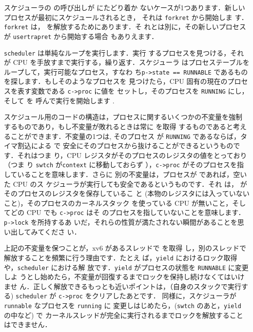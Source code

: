 スケジューラの  の呼び出しが  にたどり着か
ないケースが1つあります．新しいプロセスが最初にスケジュールされるとき，
それは \lstinline{forkret} 
から開始しま
す．\lstinline{forkret} は， を解放するためにあります．そ
れとは別に，その新しいプロセスが \lstinline{usertrapret} から開始する場合
もありえます．

\lstinline{scheduler}
は単純なループを実行します．実行
するプロセスを見つける，それが CPU を手放すまで実行する，繰り返す．スケジューラ
はプロセステーブルをループして，実行可能なプロセス，すなわ
ち\lstinline{p->state == RUNNABLE} であるものを探します．もしそのようなプロセスを
見つけたら，CPU 固有の現在のプロセスを表す変数である \lstinline{c->proc} に値を
セットし，そのプロセスを \lstinline{RUNNING} にし，そして  を
呼んで実行を開始します .

スケジュール用のコードの構造は，プロセスに関するいくつかの不変量を強制
するものであり，もし不変量が敗れるときは常に  を取得
するものであると考えることができます．不変量の1つは, そのプロセス
が \lstinline{RUNNING} であるならば，タイマ割込による で
安全にそのプロセスから抜けることができるというものです．それはつま
り，CPU レジスタがそのプロセスのレジスタの値をとっており（つま
り \lstinline{swtch} が\lstinline{context} に移動しておらず
），\lstinline{c->proc} がそのプロセスを指していることを意味します．さらに
別の不変量は，プロセスが  であれば，空いた CPU のス
ケジューラが実行しても安全であるというものです．それ
は， がそのプロセスのレジスタを保存しているこ
と (本物のレジスタには入っていないこと)，そのプロセスのカーネルスタック
を使っている CPU が無いこと，そしてどの CPU でも \lstinline{c->proc} はそ
のプロセスを指していないことを意味します．\lstinline{p->lock} を所持するあ
いだ，それらの性質が満たされない瞬間があることを思い出してみてくださ
い．

上記の不変量を保つことが，xv6 があるスレッドで  を取得
し，別のスレッドで解放することを頻繁に行う理由です．たとえ
ば，\lstinline{yield} におけるロック取得や，\lstinline{scheduler} における解
放です．\lstinline{yield} がプロセスの状態を \lstinline{RUNNABLE} に変更しよ
うとし始めたら，不変量が回復するまでロックを保持し続けなくてはいけませ
ん．正しく解放できるもっとも近いポイントは，（自身のスタックで実行する)
\lstinline{scheduler} が \lstinline{c->proc} をクリアしたあとです．
同様に，スケジューラが \lstinline{runnable} なプロセスを \lstinline{running} に
変更しはじめたら，(\lstinline{swtch} のあと，\lstinline{yield} の中など) で
カーネルスレッドが完全に実行されるまでロックを解放することはできません．


